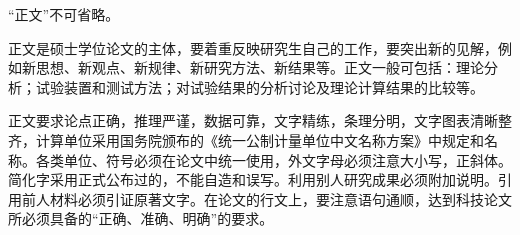 “正文”不可省略。

正文是硕士学位论文的主体，要着重反映研究生自己的工作，要突出新的见解，例如新思想、新观点、新规律、新研究方法、新结果等。正文一般可包括：理论分析；试验装置和测试方法；对试验结果的分析讨论及理论计算结果的比较等。

正文要求论点正确，推理严谨，数据可靠，文字精练，条理分明，文字图表清晰整齐，计算单位采用国务院颁布的《统一公制计量单位中文名称方案》中规定和名称。各类单位、符号必须在论文中统一使用，外文字母必须注意大小写，正斜体。简化字采用正式公布过的，不能自造和误写。利用别人研究成果必须附加说明。引用前人材料必须引证原著文字。在论文的行文上，要注意语句通顺，达到科技论文所必须具备的“正确、准确、明确”的要求。

